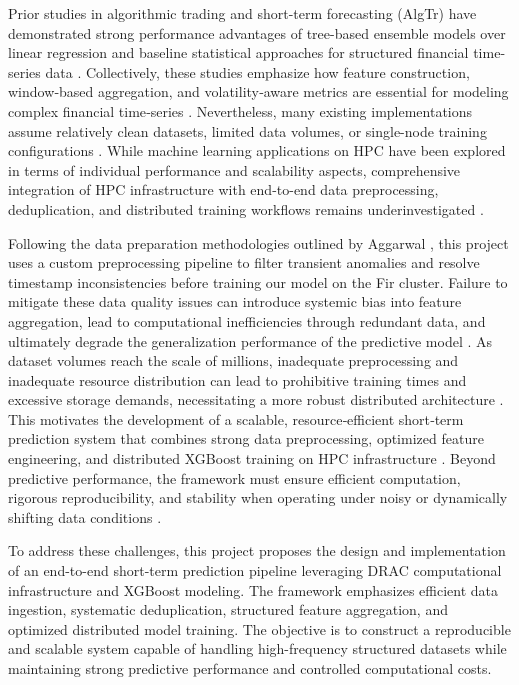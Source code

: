 \documentclass[conference]{IEEEtran}
\begin{document}
Prior studies in algorithmic trading and short-term forecasting (AlgTr) have demonstrated strong performance advantages of tree-based ensemble models over linear regression and baseline statistical approaches for structured financial time-series data \cite{fama1970efficient, hull2017options}. Collectively, these studies emphasize how feature construction, window‑based aggregation, and volatility‑aware metrics are essential for modeling complex financial time‑series \cite{lopezdeprado2018afml}. Nevertheless, many existing implementations assume relatively clean datasets, limited data volumes, or single-node training configurations \cite{widmer1996learning}. While machine learning applications on HPC have been explored in terms of individual performance and scalability aspects, comprehensive integration of HPC infrastructure with end-to-end data preprocessing, deduplication, and distributed training workflows remains underinvestigated \cite{lewis2025io, badia2024dagstuhl}.

Following the data preparation methodologies outlined by Aggarwal \cite{aggarwal2015datamining}, this project uses a custom preprocessing pipeline to filter transient anomalies and resolve timestamp inconsistencies before training our model on the Fir cluster. Failure to mitigate these data quality issues can introduce systemic bias into feature aggregation, lead to computational inefficiencies through redundant data, and ultimately degrade the generalization performance of the predictive model \cite{han2011datamining}. As dataset volumes reach the scale of millions, inadequate preprocessing and inadequate resource distribution can lead to prohibitive training times and excessive storage demands, necessitating a more robust distributed architecture \cite{chen2016xgboost, hwang2012distributed}. This motivates the development of a scalable, resource‑efficient short‑term prediction system that combines strong data preprocessing, optimized feature engineering, and distributed XGBoost training on HPC infrastructure \cite{raschka2019pythonml}. Beyond predictive performance, the framework must ensure efficient computation, rigorous reproducibility, and stability when operating under noisy or dynamically shifting data conditions \cite{peng2011reproducible}. 

To address these challenges, this project proposes the design and implementation of an end-to-end short-term prediction pipeline leveraging DRAC computational infrastructure and XGBoost modeling. The framework emphasizes efficient data ingestion, systematic deduplication, structured feature aggregation, and optimized distributed model training. The objective is to construct a reproducible and scalable system capable of handling high-frequency structured datasets while maintaining strong predictive performance and controlled computational costs.
\end{document}
